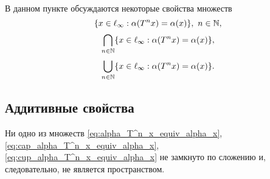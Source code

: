 В данном пункте обсуждаются некоторые свойства множеств
\begin{equation}
	\label{eq:alpha_T^n_x_equiv_alpha_x}
	\{x \in \ell_\infty : \alpha(T^n x) = \alpha(x) \}, ~n\in\N,
\end{equation}
\begin{equation}
	\label{eq:cap_alpha_T^n_x_equiv_alpha_x}
	\bigcap\limits_{n\in\N}\{x \in \ell_\infty : \alpha(T^n x) = \alpha(x) \}
	,
\end{equation}
\begin{equation}
	\label{eq:cup_alpha_T^n_x_equiv_alpha_x}
	\bigcup_{n\in\N}\{x \in \ell_\infty : \alpha(T^n x) = \alpha(x) \}
	.
\end{equation}

\subsection{Аддитивные свойства}

\begin{theorem}
	Ни одно из множеств
	\eqref{eq:alpha_T^n_x_equiv_alpha_x}, \eqref{eq:cap_alpha_T^n_x_equiv_alpha_x}, \eqref{eq:cup_alpha_T^n_x_equiv_alpha_x}
	не замкнуто по сложению и, следовательно, не является пространством.
\end{theorem}

